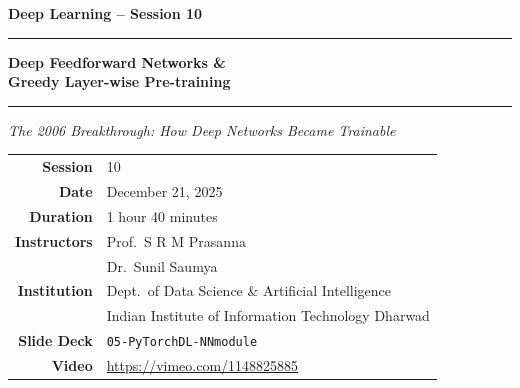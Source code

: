 \documentclass[12pt,a4paper]{article}
\begin{document}
\begin{titlepage}
  \centering
  \vspace*{1.5cm}
  {\LARGE\bfseries Deep Learning -- Session 10\par}
  \vspace{0.5cm}
  \rule{\linewidth}{1.5pt}\par
  \vspace{0.4cm}
  {\huge\bfseries Deep Feedforward Networks \&\\[0.3em]
   Greedy Layer-wise Pre-training\par}
  \vspace{0.4cm}
  \rule{\linewidth}{1.5pt}\par
  \vspace{1.2cm}
  {\large\itshape The 2006 Breakthrough: How Deep Networks Became Trainable\par}
  \vspace{1.5cm}
  \begin{tabular}{rl}
    \textbf{Session}      & 10 \\[4pt]
    \textbf{Date}         & December 21, 2025 \\[4pt]
    \textbf{Duration}     & 1 hour 40 minutes \\[4pt]
    \textbf{Instructors}  & Prof.\ S R M Prasanna \\
                          & Dr.\ Sunil Saumya \\[4pt]
    \textbf{Institution}  & Dept.\ of Data Science \& Artificial Intelligence \\
                          & Indian Institute of Information Technology Dharwad \\[4pt]
    \textbf{Slide Deck}   & \texttt{05-PyTorchDL-NNmodule} \\[4pt]
    \textbf{Video}        & \url{https://vimeo.com/1148825885} \\
  \end{tabular}
  \vspace{1.5cm}


\end{titlepage}
\end{document}
